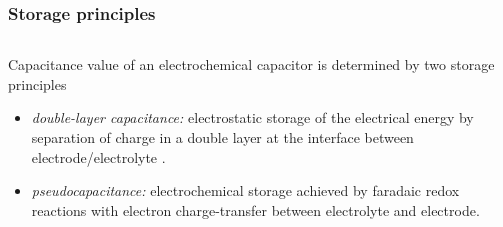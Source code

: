 \documentclass[10pt,xcolor=dvipsnames,compress]{beamer}
\begin{document}
\begin{frame}
\frametitle{Storage principles}
\vfill

\begin{columns}[T] %
     \begin{column}[T]{5.5cm} %
\begin{block}{}
Capacitance value of an electrochemical capacitor is determined by two storage principles
\begin{itemize}
\item \textit{double-layer capacitance:} electrostatic storage of the electrical energy
by separation of charge in a double layer at the interface between electrode/electrolyte .
\item \textit{pseudocapacitance:} electrochemical storage achieved by faradaic redox reactions with electron charge-transfer between electrolyte and electrode. 



\end{itemize}
\end{block}
\end{column}
\end{columns}
\end{frame}
\end{document}
